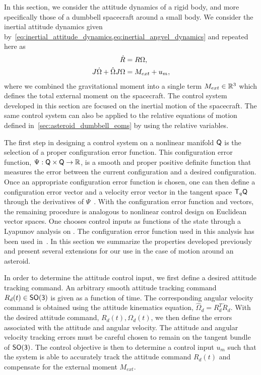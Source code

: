In this section, we consider the attitude dynamics of a rigid body, and more specifically those of a dumbbell spacecraft around a small body. 
We consider the inertial attitude dynamics given by~\cref{eq:inertial_attitude_dynamics,eq:inertial_angvel_dynamics} and repeated here as
\begin{align*}
    \dot{R} &= R \Omega, \\
    J \dot{\Omega} + \hat{\Omega} J \Omega &= M_{ext} + u_m,
\end{align*}
where we combined the gravitational moment into a single term \( M_{ext} \in \mathbb{R}^3 \) which defines the total external moment on the spacecraft.
The control system developed in this section are focused on the inertial motion of the spacecraft.
The same control system can also be applied to the relative equations of motion defined in~\cref{sec:asteroid_dumbbell_eoms} by using the relative variables.

The first step in designing a control system on a nonlinear manifold \( \mathsf{Q} \) is the selection of a proper configuration error function. 
This configuration error function, \( \Psi : \mathsf{Q} \times \mathsf{Q} \to \mathbb{R} \), is a smooth and proper positive definite function that measures the error between the current configuration and a desired configuration. 
Once an appropriate configuration error function is chosen, one can then define a configuration error vector and a velocity error vector in the tangent space \( \mathsf{T}_q \mathsf{Q} \) through the derivatives of \( \Psi \)~\cite{bullo2004}. 
With the configuration error function and vectors, the remaining procedure is analogous to nonlinear control design on Euclidean vector spaces. 
One chooses control inputs as functions of the state through a Lyapunov analysis on \Q.
The configuration error function used in this analysis has been used in~\cite{bullo2004,chaturvedi2009,lee2011a,kulumani2017a}.
In this section we summarize the properties developed previously and present several extensions for our use in the case of motion around an asteroid.

In order to determine the attitude control input, we first define a desired attitude tracking command.
An arbitrary smooth attitude tracking command \( R_d (t) \in \mathsf{SO(3)} \) is given as a function of time.
The corresponding angular velocity command is obtained using the attitude kinematics equation, \( \hat{\Omega}_d = R_d^T \dot{R}_d \).
With the desired attitude command, \( R_d(t), \Omega_d(t) \), we then define the errors associated with the attitude and angular velocity.
The attitude and angular velocity tracking errors must be careful chosen to remain on the tangent bundle of \(\mathsf{SO(3)}\).
The control objective is then to determine a control input \( u_m \) such that the system is able to accurately track the attitude command \( R_d(t) \) and compensate for the external moment \( M_{ext} \).

